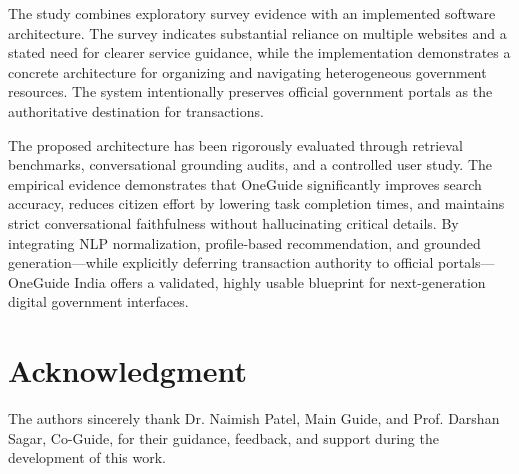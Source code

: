 \documentclass[conference]{IEEEtran}
\begin{document}
The study combines exploratory survey evidence with an implemented software architecture. The survey indicates substantial reliance on multiple websites and a stated need for clearer service guidance, while the implementation demonstrates a concrete architecture for organizing and navigating heterogeneous government resources. The system intentionally preserves official government portals as the authoritative destination for transactions.

The proposed architecture has been rigorously evaluated through retrieval benchmarks, conversational grounding audits, and a controlled user study. The empirical evidence demonstrates that OneGuide significantly improves search accuracy, reduces citizen effort by lowering task completion times, and maintains strict conversational faithfulness without hallucinating critical details. By integrating NLP normalization, profile-based recommendation, and grounded generation---while explicitly deferring transaction authority to official portals---OneGuide India offers a validated, highly usable blueprint for next-generation digital government interfaces.

\balance
\section*{Acknowledgment}
The authors sincerely thank Dr. Naimish Patel, Main Guide, and Prof. Darshan Sagar, Co-Guide, for their guidance, feedback, and support during the development of this work.
\end{document}

